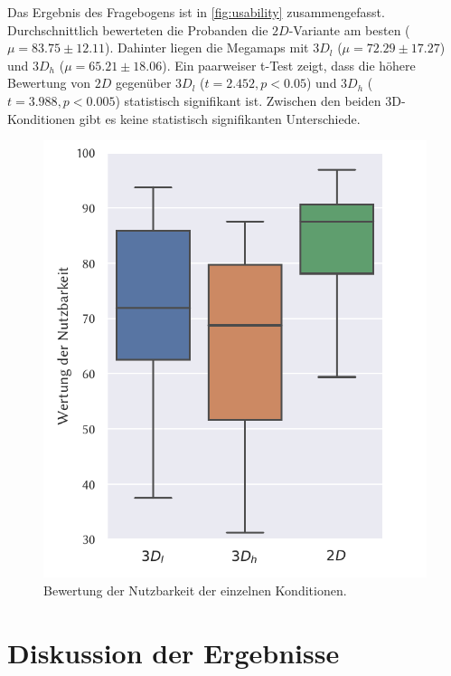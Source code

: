 Das Ergebnis des Fragebogens ist in \autoref{fig:usability} zusammengefasst.
Durchschnittlich bewerteten die Probanden die $2D$-Variante am besten ($\mu = \num{83,75} \pm \num{12,11}$).
Dahinter liegen die Megamaps mit $3D_l$ ($\mu = \num{72,29} \pm \num{17,27}$) und $3D_h$ ($\mu = \num{65,21} \pm \num{18.06}$).
Ein paarweiser t-Test zeigt, dass die höhere Bewertung von $2D$ gegenüber $3D_l$ ($t = 2.452, p < 0.05$) und $3D_h$ ($t = 3.988, p < 0.005$) statistisch signifikant ist.
Zwischen den beiden 3D-Konditionen gibt es keine statistisch signifikanten Unterschiede.
\begin{figure}
    \centering
    \includegraphics[width=0.7\linewidth]{figures/analysis/usability}
    \caption{Bewertung der Nutzbarkeit der einzelnen Konditionen.}
    \label{fig:usability}
\end{figure}

\section{Diskussion der Ergebnisse}

%
\cleardoublepage
